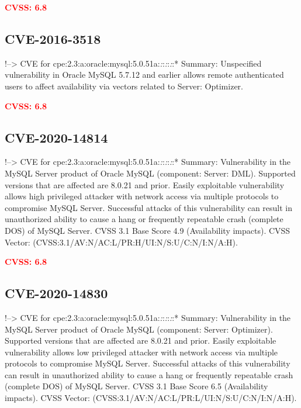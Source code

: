 \documentclass[a4paper, 12pt]{article}
\begin{document}
\textbf{\textcolor{red}{CVSS: 6.8}}

\hypertarget{cve-2016-3518}{%
\subsection{CVE-2016-3518}\label{cve-2016-3518}}

!--\textgreater{} CVE for
cpe:2.3:a:oracle:mysql:5.0.51a:\emph{:}:\emph{:}:\emph{:}:* Summary:
Unspecified vulnerability in Oracle MySQL 5.7.12 and earlier allows
remote authenticated users to affect availability via vectors related to
Server: Optimizer.

\textbf{\textcolor{red}{CVSS: 6.8}}

\hypertarget{cve-2020-14814}{%
\subsection{CVE-2020-14814}\label{cve-2020-14814}}

!--\textgreater{} CVE for
cpe:2.3:a:oracle:mysql:5.0.51a:\emph{:}:\emph{:}:\emph{:}:* Summary:
Vulnerability in the MySQL Server product of Oracle MySQL (component:
Server: DML). Supported versions that are affected are 8.0.21 and prior.
Easily exploitable vulnerability allows high privileged attacker with
network access via multiple protocols to compromise MySQL Server.
Successful attacks of this vulnerability can result in unauthorized
ability to cause a hang or frequently repeatable crash (complete DOS) of
MySQL Server. CVSS 3.1 Base Score 4.9 (Availability impacts). CVSS
Vector: (CVSS:3.1/AV:N/AC:L/PR:H/UI:N/S:U/C:N/I:N/A:H).

\textbf{\textcolor{red}{CVSS: 6.8}}

\hypertarget{cve-2020-14830}{%
\subsection{CVE-2020-14830}\label{cve-2020-14830}}

!--\textgreater{} CVE for
cpe:2.3:a:oracle:mysql:5.0.51a:\emph{:}:\emph{:}:\emph{:}:* Summary:
Vulnerability in the MySQL Server product of Oracle MySQL (component:
Server: Optimizer). Supported versions that are affected are 8.0.21 and
prior. Easily exploitable vulnerability allows low privileged attacker
with network access via multiple protocols to compromise MySQL Server.
Successful attacks of this vulnerability can result in unauthorized
ability to cause a hang or frequently repeatable crash (complete DOS) of
MySQL Server. CVSS 3.1 Base Score 6.5 (Availability impacts). CVSS
Vector: (CVSS:3.1/AV:N/AC:L/PR:L/UI:N/S:U/C:N/I:N/A:H).
\end{document}
